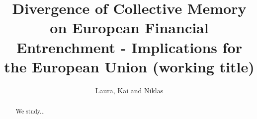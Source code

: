 \documentclass[12pt]{article}
\begin{document}
\title{Divergence of Collective Memory on European Financial Entrenchment -
Implications for the European Union (working title)}
\author{Laura, Kai and Niklas}
\maketitle

\begin{abstract}
We study...
\end{abstract}
\clearpage






%



\clearpage




\clearpage


\end{document}
